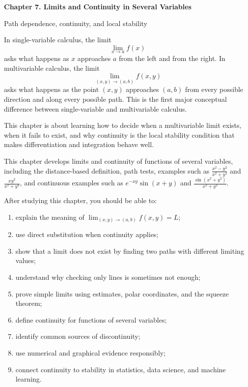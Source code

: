 \documentclass[11pt]{article}
\begin{document}
\begin{center}
  {\LARGE\bfseries Chapter 7. Limits and Continuity in Several Variables\par}
  \vspace{0.3em}
  {\large Path dependence, continuity, and local stability\par}
\end{center}

\begin{chapteroverviewbox}
In single-variable calculus, the limit
\[
\lim_{x\to a} f(x)
\]
asks what happens as $x$ approaches $a$ from the left and from the right. In multivariable calculus, the limit
\[
\lim_{(x,y)\to(a,b)} f(x,y)
\]
asks what happens as the point $(x,y)$ approaches $(a,b)$ from every possible direction and along every possible path. This is the first major conceptual difference between single-variable and multivariable calculus.

This chapter is about learning how to decide when a multivariable limit exists, when it fails to exist, and why continuity is the local stability condition that makes differentiation and integration behave well.
\end{chapteroverviewbox}

\begin{notebox}[Connection]
This chapter develops limits and continuity of functions of several variables, including the distance-based definition, path tests, examples such as $\frac{x^2-y^2}{x^2+y^2}$ and $\frac{xy^2}{x^2+y^4}$, and continuous examples such as $e^{-xy}\sin(x+y)$ and $\frac{\sin(x^2+y^2)}{x^2+y^2}$.
\end{notebox}

\begin{goalbox}
After studying this chapter, you should be able to:
\begin{enumerate}
  \item explain the meaning of $\lim_{(x,y)\to(a,b)} f(x,y)=L$;
  \item use direct substitution when continuity applies;
  \item show that a limit does not exist by finding two paths with different limiting values;
  \item understand why checking only lines is sometimes not enough;
  \item prove simple limits using estimates, polar coordinates, and the squeeze theorem;
  \item define continuity for functions of several variables;
  \item identify common sources of discontinuity;
  \item use numerical and graphical evidence responsibly;
  \item connect continuity to stability in statistics, data science, and machine learning.
\end{enumerate}
\end{goalbox}
\end{document}

